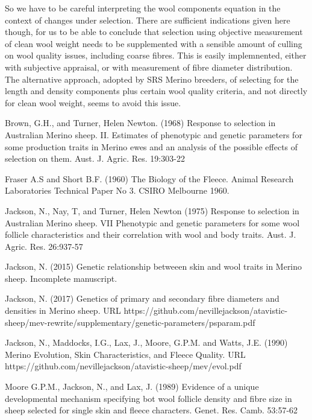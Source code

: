 \documentclass[titlepage]{article}  %
\begin{document}
So we have to be careful interpreting the wool components equation in the context of changes under selection.  There are sufficient indications given here though, for us to be able to conclude that selection using objective measurement of clean wool weight needs to be supplemented with a sensible amount of culling on wool quality issues, including coarse fibres. This is easily implemnented, either with subjective appraisal, or with measurement of fibre diameter distribution. The alternative approach, adopted by SRS Merino breeders, of selecting for the length and density components plus certain wool quality criteria, and not directly for clean wool weight, seems to avoid this issue.


\clearpage
\begin{thebibliography}{99}

Brown, G.H., and Turner, Helen Newton. (1968) Response to selection in Australian Merino sheep. II. Estimates of phenotypic and genetic parameters for some production traits in Merino ewes and an analysis of the possible effects of selection on them. Aust. J. Agric. Res. 19:303-22


Fraser A.S and Short B.F. (1960) The Biology of the Fleece. Animal Research Laboratories Technical Paper No 3. CSIRO Melbourne 1960.

Jackson, N., Nay, T, and Turner, Helen Newton (1975) Response to selection in Australian Merino sheep. VII Phenotypic and genetic parameters for some wool follicle characteristics and their correlation with wool and body traits. Aust. J. Agric. Res. 26:937-57

Jackson, N. (2015) Genetic relationship betweeen skin and wool traits in Merino sheep. Incomplete manuscript.

Jackson, N. (2017) Genetics of primary and secondary fibre diameters and densities in Merino sheep. URL https://github.com/nevillejackson/atavistic-sheep/mev-rewrite/supplementary/genetic-parameters/psparam.pdf

Jackson, N., Maddocks, I.G., Lax, J., Moore, G.P.M. and Watts, J.E. (1990) Merino Evolution, Skin Characteristics, and Fleece Quality. URL https://github.com/nevillejackson/atavistic-sheep/mev/evol.pdf 

Moore G.P.M., Jackson, N., and Lax, J. (1989) Evidence of a unique developmental mechanism specifying bot wool follicle density and fibre size in sheep selected for single skin and fleece characters. Genet. Res. Camb. 53:57-62


\end{thebibliography}
\end{document}
